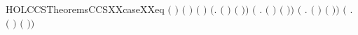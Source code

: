 \begin{SaveVerbatim}{HOLCCSTheoremsCCSXXcaseXXeq}
\HOLTokenTurnstile{} \ensuremath{(}          \HOLSymConst{\ensuremath{=}} \ensuremath{)} \HOLSymConst{\HOLTokenEquiv{}}
   \ensuremath{(} \HOLSymConst{\ensuremath{=}} \ensuremath{)} \HOLSymConst{\HOLTokenConj{}} \ensuremath{(} \HOLSymConst{\ensuremath{=}} \ensuremath{)} \HOLSymConst{\HOLTokenDisj{}} \ensuremath{(}\HOLSymConst{\HOLTokenExists{}}. \ensuremath{(} \HOLSymConst{\ensuremath{=}}  \ensuremath{)} \HOLSymConst{\HOLTokenConj{}} \ensuremath{(}  \HOLSymConst{\ensuremath{=}} \ensuremath{)}\ensuremath{)} \HOLSymConst{\HOLTokenDisj{}}
   \ensuremath{(}\HOLSymConst{\HOLTokenExists{}} . \ensuremath{(} \HOLSymConst{\ensuremath{=}} \HOLSymConst{\ensuremath{\ldotp}}\ensuremath{)} \HOLSymConst{\HOLTokenConj{}} \ensuremath{(}   \HOLSymConst{\ensuremath{=}} \ensuremath{)}\ensuremath{)} \HOLSymConst{\HOLTokenDisj{}}
   \ensuremath{(}\HOLSymConst{\HOLTokenExists{}} . \ensuremath{(} \HOLSymConst{\ensuremath{=}}  \HOLSymConst{\ensuremath{+}} \ensuremath{)} \HOLSymConst{\HOLTokenConj{}} \ensuremath{(}   \HOLSymConst{\ensuremath{=}} \ensuremath{)}\ensuremath{)} \HOLSymConst{\HOLTokenDisj{}}
   \ensuremath{(}\HOLSymConst{\HOLTokenExists{}} . \ensuremath{(} \HOLSymConst{\ensuremath{=}}  \HOLSymConst{\ensuremath{\mid}} \ensuremath{)} \HOLSymConst{\HOLTokenConj{}} \ensuremath{(}   \HOLSymConst{\ensuremath{=}} \ensuremath{)}\ensuremath{)} \HOLSymConst{\HOLTokenDisj{}}

\end{SaveVerbatim}
